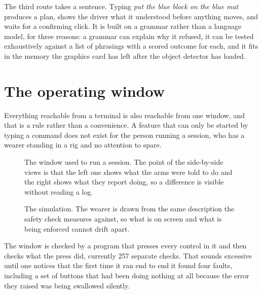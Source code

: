 The third route takes a sentence. Typing \emph{put the blue block on the blue
mat} produces a plan, shows the driver what it understood before anything
moves, and waits for a confirming click. It is built on a grammar rather than
a language model, for three reasons: a grammar can explain why it refused, it
can be tested exhaustively against a list of phrasings with a scored outcome
for each, and it fits in the memory the graphics card has left after the
object detector has loaded.

\section{The operating window}

Everything reachable from a terminal is also reachable from one window, and
that is a rule rather than a convenience. A feature that can only be started
by typing a command does not exist for the person running a session, who has
a wearer standing in a rig and no attention to spare.

\begin{figure}[htbp]
  \centering
  \caption[The operating window]{The window used to run a session. The point
  of the side-by-side views is that the left one shows what the arms were
  told to do and the right shows what they report doing, so a difference is
  visible without reading a log.}
  \label{fig:gui}
\end{figure}

\begin{figure}[htbp]
  \centering
  \caption[The simulated scene]{The simulation. The wearer is drawn from the
  same description the safety check measures against, so what is on screen and
  what is being enforced cannot drift apart.}
  \label{fig:sim}
\end{figure}

The window is checked by a program that presses every control in it and then
checks what the press did, currently 257 separate checks. That sounds
excessive until one notices that the first time it ran end to end it found
four faults, including a set of buttons that had been doing nothing at all
because the error they raised was being swallowed silently.
